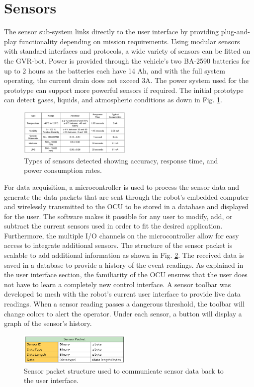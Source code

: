 \section{Sensors}\label{sec:sensors}

The sensor sub-system links directly to the user interface by providing plug-and-play functionality depending on mission requirements. Using modular sensors with standard interfaces and protocols, a wide variety of sensors can be fitted on the GVR-bot. Power is provided through the vehicle's two BA-2590 batteries for up to 2 hours as the batteries each have 14 Ah, and with the full system operating, the current drain does not exceed 3A. The power system used for the prototype can support more powerful sensors if required.  The initial prototype can detect gases, liquids, and atmospheric conditions as down in Fig. \ref{fig:params}.

\begin{figure}
	\centering
	\includegraphics[width=0.48\textwidth]{./pictures/sensor_params.png}
	\caption{Types of sensors detected showing accuracy, response time, and power consumption rates.}
	\label{fig:params}
\end{figure}

For data acquisition, a microcontroller is used to process the sensor data and generate the data packets that are sent through the robot's embedded computer and wirelessly transmitted to the OCU to be stored in a database and displayed for the user. The software makes it possible for any user to modify, add, or subtract the current sensors used in order to fit the desired application. Furthermore, the multiple I/O channels on the microcontroller allow for easy access to integrate additional sensors. The structure of the sensor packet is scalable to add additional information as shown in Fig. \ref{fig:packet}. The received data is saved in a database to provide a history of the event readings. As explained in the user interface section, the familiarity of the OCU ensures that the user does not have to learn a completely new control interface. A sensor toolbar was developed to mesh with the robot's current user interface to provide live data readings. When a sensor reading passes a dangerous threshold, the toolbar will change colors to alert the operator. Under each sensor, a button will display a graph of the sensor's history.

\begin{figure}
	\centering
	\includegraphics[width=0.48\textwidth]{./pictures/packet.png}
	\caption{Sensor packet structure used to communicate sensor data back to the user interface.}
	\label{fig:packet}
\end{figure}
